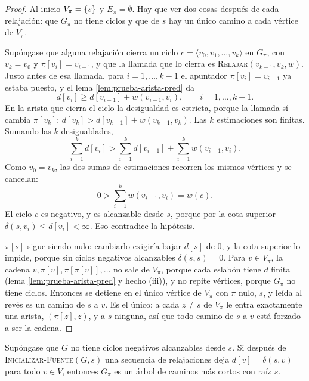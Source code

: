 \documentclass[11pt,letterpaper]{article}
\begin{document}
\begin{proof}
  Al inicio $V_\pi = \left\{ s \right\}$ y $E_\pi = \emptyset$. Hay que ver dos
  cosas después de cada relajación: que $G_\pi$ no tiene ciclos y que
  de $s$ hay un único camino a cada vértice de $V_\pi$.

   Supóngase que alguna relajación
  cierra un ciclo $c = \langle v_0, v_1, \dots, v_k \rangle$ en
  $G_\pi$, con $v_k = v_0$ y $\pi[v_i] = v_{i-1}$, y que la llamada
  que lo cierra es \textsc{Relajar}$(v_{k-1}, v_k, w)$. Justo antes de
  esa llamada, para $i = 1, \dots, k - 1$ el apuntador
  $\pi[v_i] = v_{i-1}$ ya estaba puesto, y el lema
  \ref{lem:prueba-arista-pred} da
  \[
    d[v_i] \ge d[v_{i-1}] + w(v_{i-1}, v_i) ,
    \qquad i = 1, \dots, k - 1 .
  \]
  En la arista que cierra el ciclo la desigualdad es estricta, porque
  la llamada sí cambia $\pi[v_k]$:
  $d[v_k] > d[v_{k-1}] + w(v_{k-1}, v_k)$. Las $k$ estimaciones son
  finitas. Sumando las $k$ desigualdades,
  \[
    \sum_{i=1}^{k} d[v_i] > \sum_{i=1}^{k} d[v_{i-1}]
      + \sum_{i=1}^{k} w(v_{i-1}, v_i) .
  \]
  Como $v_0 = v_k$, las dos sumas de estimaciones recorren los mismos
  vértices y se cancelan:
  \[
    0 > \sum_{i=1}^{k} w(v_{i-1}, v_i) = w(c) .
  \]
  El ciclo $c$ es negativo, y es alcanzable desde $s$, porque por la
  cota superior $\delta(s, v_i) \le d[v_i] < \infty$. Eso contradice
  la hipótesis.

  $\pi[s]$ sigue siendo nulo: cambiarlo exigiría bajar $d[s]$ de $0$,
  y la cota superior lo impide, porque sin ciclos negativos
  alcanzables $\delta(s, s) = 0$. Para $v \in V_\pi$, la cadena
  $v, \pi[v], \pi[\pi[v]], \dots$ no sale de $V_\pi$, porque cada
  eslabón tiene $d$ finita (lema \ref{lem:prueba-arista-pred} y hecho
  (iii)), y no repite vértices, porque $G_\pi$ no tiene ciclos.
  Entonces se detiene en el único vértice de $V_\pi$ con $\pi$ nulo,
  $s$, y leída al revés es un camino de $s$ a $v$. Es el único: a cada
  $z \ne s$ de $V_\pi$ le entra exactamente una arista,
  $(\pi[z], z)$, y a $s$ ninguna, así que todo camino de $s$ a $v$
  está forzado a ser la cadena.
\end{proof}

\begin{lema}
  \label{lem:prueba-subgrafo-pred}
  Supóngase que $G$ no tiene ciclos negativos alcanzables desde $s$.
  Si después de \textsc{Inicializar-Fuente}$(G, s)$ una secuencia de
  relajaciones deja $d[v] = \delta(s, v)$ para todo $v \in V$,
  entonces $G_\pi$ es un árbol de caminos más cortos con raíz $s$.
\end{lema}
\end{document}
